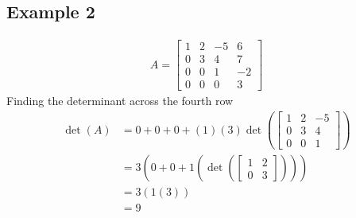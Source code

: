 \documentclass{article}
\theoremstyle{mytheoremstyle}
\theoremstyle{mytheoremstyle}
\theoremstyle{myproblemstyle}
\begin{document}
    \subsection*{Example 2}
    \begin{align*}
        A = \begin{bmatrix}
            1 & 2 & -5 & 6 \\
            0 & 3 & 4 & 7 \\
            0 & 0 & 1 & -2 \\
            0 & 0 & 0 & 3
        \end{bmatrix}
    \end{align*}
    Finding the determinant across the fourth row
    \begin{align*}
        \det(A) &= 0 + 0 + 0 + (1)(3)\det(\begin{bmatrix}
            1 & 2 & -5 \\
            0 & 3 & 4 \\
            0 & 0 & 1
        \end{bmatrix}) \\
        &= 3(0 + 0 + 1(\det(\begin{bmatrix}
            1 & 2 \\
            0 & 3
        \end{bmatrix}))) \\
        &= 3(1(3)) \\
        &= 9
    \end{align*}
\end{document}
